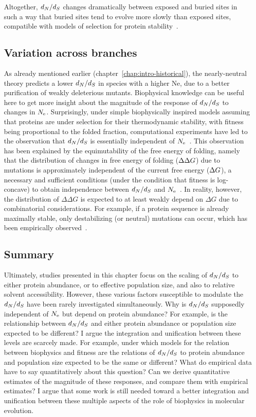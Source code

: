 Altogether, $d_N / d_S$ changes dramatically between exposed and buried sites in such a way that buried sites tend to evolve more slowly than exposed sites, compatible with models of selection for protein stability~\citep{Echave2016}.

\subsection{Variation across branches}
\label{subsec:thermo-variation-across-branches}

As already mentioned earlier (chapter~\ref{chap:intro-historical}), the nearly-neutral theory predicts a lower $d_N / d_S$ in species with a higher Ne, due to a better purification of weakly deleterious mutants.
Biophysical knowledge can be useful here to get more insight about the magnitude of the response of $d_N / d_S$ to changes in $N_{\textrm{e}}$.
Surprisingly, under simple biophysically inspired models assuming that proteins are under selection for their thermodynamic stability, with fitness being proportional to the folded fraction, computational experiments have led to the observation that $d_N / d_S$ is essentially independent of $N_{\textrm{e}}$~\citep{Goldstein2013}.
This observation has been explained by the equimutability of the free energy of folding, namely that the distribution of changes in free energy of folding ($\Delta \Delta G$) due to mutations is approximately independent of the current free energy ($\Delta G$), a necessary and sufficient conditions (under the condition that fitness is log-concave) to obtain independence between $d_N / d_S$ and $N_{\textrm{e}}$~\citep{Cherry1998}.
In reality, however, the distribution of $\Delta \Delta G$ is expected to at least weakly depend on $\Delta G$ due to combinatorial considerations.
For example, if a protein sequence is already maximally stable, only destabilizing (or neutral) mutations can occur, which has been empirically observed~\citep{Serohijos2012}.

\subsection{Summary}

Ultimately, studies presented in this chapter focus on the scaling of $d_N / d_S$ to either protein abundance, or to effective population size, and also to relative solvent accessibility.
However, these various factors susceptible to modulate the $d_N / d_S$ have been rarely investigated simultaneously.
Why is $d_N / d_S$ supposedly independent of $N_{\textrm{e}}$ but depend on protein abundance?
For example, is the relationship between $d_N / d_S$ and either protein abundance or population size expected to be different?
I argue the integration and unification between these levels are scarcely made.
For example, under which models for the relation between biophysics and fitness are the relations of $d_N / d_S$ to protein abundance and population size expected to be the same or different?
What do empirical data have to say quantitatively about this question?
Can we derive quantitative estimates of the magnitude of these responses, and compare them with empirical estimates?
I argue that some work is still needed toward a better integration and unification between these multiple aspects of the role of biophysics in molecular evolution.

